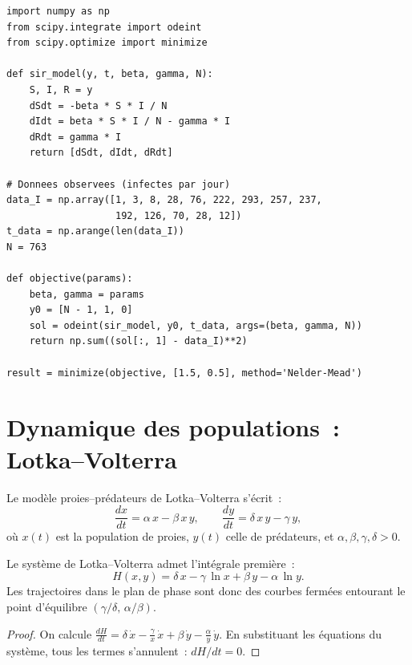 \begin{verbatim}
import numpy as np
from scipy.integrate import odeint
from scipy.optimize import minimize

def sir_model(y, t, beta, gamma, N):
    S, I, R = y
    dSdt = -beta * S * I / N
    dIdt = beta * S * I / N - gamma * I
    dRdt = gamma * I
    return [dSdt, dIdt, dRdt]

# Donnees observees (infectes par jour)
data_I = np.array([1, 3, 8, 28, 76, 222, 293, 257, 237,
                   192, 126, 70, 28, 12])
t_data = np.arange(len(data_I))
N = 763

def objective(params):
    beta, gamma = params
    y0 = [N - 1, 1, 0]
    sol = odeint(sir_model, y0, t_data, args=(beta, gamma, N))
    return np.sum((sol[:, 1] - data_I)**2)

result = minimize(objective, [1.5, 0.5], method='Nelder-Mead')
\end{verbatim}

\section{Dynamique des populations~: Lotka--Volterra}
\label{sec:lotka_volterra}

\begin{definition}
Le mod\`ele proies--pr\'edateurs de Lotka--Volterra s'\'ecrit~:
\[
  \frac{dx}{dt} = \alpha\, x - \beta\, x\, y, \qquad
  \frac{dy}{dt} = \delta\, x\, y - \gamma\, y,
\]
o\`u $x(t)$ est la population de proies, $y(t)$ celle de pr\'edateurs,
et $\alpha, \beta, \gamma, \delta > 0$.
\end{definition}

\begin{proposition}
Le syst\`eme de Lotka--Volterra admet l'int\'egrale premi\`ere~:
\[
  H(x,y) = \delta\, x - \gamma\,\ln x + \beta\, y - \alpha\,\ln y.
\]
Les trajectoires dans le plan de phase sont donc des courbes ferm\'ees
entourant le point d'\'equilibre $(\gamma/\delta,\, \alpha/\beta)$.
\end{proposition}

\begin{proof}
On calcule $\frac{dH}{dt} = \delta\,\dot{x} - \frac{\gamma}{x}\,\dot{x}
+ \beta\,\dot{y} - \frac{\alpha}{y}\,\dot{y}$. En substituant les
\'equations du syst\`eme, tous les termes s'annulent~: $dH/dt = 0$.
\end{proof}

